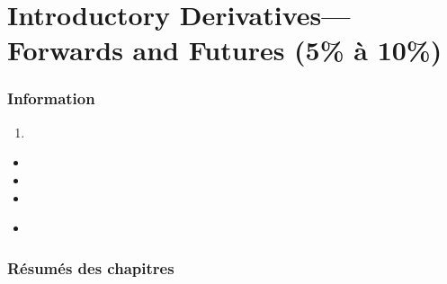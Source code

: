 \chapter[Introductory Derivatives---Forwards and Futures]{Introductory Derivatives---Forwards and Futures (5\% à 10\%)}

\subsection{Information}

\begin{distributions}[Objective]

\end{distributions}

\begin{outcomes}
\begin{enumerate}
	\item	
\end{enumerate}
\end{outcomes}

\begin{ASM_chapter}
\begin{itemize}
	\item	{}
	\item	{}
	\item	{}
\end{itemize}
\end{ASM_chapter}

\begin{YTB_vids}
\begin{itemize}
	\item	
\end{itemize}
\end{YTB_vids}

\subsection{Résumés des chapitres}


